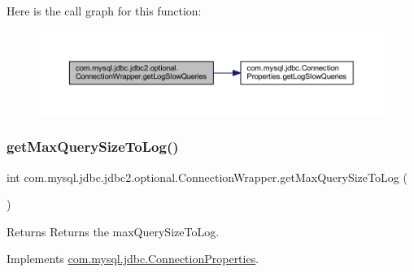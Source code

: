 Here is the call graph for this function\+:
\nopagebreak
\begin{figure}[H]
\begin{center}
\leavevmode
\includegraphics[width=350pt]{classcom_1_1mysql_1_1jdbc_1_1jdbc2_1_1optional_1_1_connection_wrapper_ad4c40181a8ac4df23cc62cdfa67068ad_cgraph}
\end{center}
\end{figure}
\mbox{\label{classcom_1_1mysql_1_1jdbc_1_1jdbc2_1_1optional_1_1_connection_wrapper_a10bd62b5a610b69fcbd7274831405151}} 
\subsubsection{\texorpdfstring{get\+Max\+Query\+Size\+To\+Log()}{getMaxQuerySizeToLog()}}
{\footnotesize\ttfamily int com.\+mysql.\+jdbc.\+jdbc2.\+optional.\+Connection\+Wrapper.\+get\+Max\+Query\+Size\+To\+Log (\begin{DoxyParamCaption}{ }\end{DoxyParamCaption})}

\begin{DoxyReturn}{Returns}
Returns the max\+Query\+Size\+To\+Log. 
\end{DoxyReturn}


Implements \mbox{\hyperlink{interfacecom_1_1mysql_1_1jdbc_1_1_connection_properties_a55edac0ea8c39a11c087948106b3527c}{com.\+mysql.\+jdbc.\+Connection\+Properties}}.

